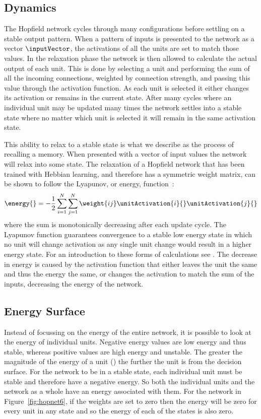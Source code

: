 \subsection{Dynamics}
\label{sec:Dynamics}
The Hopfield network cycles through many configurations before settling on a stable output pattern.  When a pattern of inputs is presented to the network as a vector $\inputVector$, the activations of all the units are set to match those values.  In the relaxation phase the network is then allowed to calculate the actual output of each unit.  This is done by selecting a unit and performing the sum of all the incoming connections, weighted by connection strength, and passing this value through the activation function.  As each unit is selected it either changes its activation or remains in the current state.  After many cycles where an individual unit may be updated many times the network settles into a stable state where no matter which unit is selected it will remain in the same activation state.

This ability to relax to a stable state is what we describe as the process of recalling a memory. When presented with a vector of input values the network will relax into some state.  The relaxation of a Hopfield network that has been trained with Hebbian learning, and therefore has a symmetric weight matrix, can be shown to follow the Lyapunov, or energy, function~\citep{Hopfield82,Kuhn1991}: 
\begin{equation}
	\label{eq:energyNetwork}
	\displaystyle\energy{}= -\frac{1}{2}\sum^{N}_{i=1}\sum^{N}_{j=1}\weight{ij}\unitActivation{i}{}\unitActivation{j}{}
\end{equation}
where the sum \energy{} is monotonically decreasing after each update cycle.  The Lyapunov function guarantees convergence to a stable low energy state in which no unit will change activation as any single unit change would result in a higher energy state.  For an introduction to these forms of calculations see \citet{Hertz1991}. The decrease in energy is caused by the activation function that either leaves the unit the same and thus the energy the same, or changes the activation to match the sum of the inputs, decreasing the energy of the network.

\subsection{Energy Surface}
\label{sec:energy}

Instead of focussing on the energy of the entire network, it is possible to look at the energy of individual units. Negative energy values are low energy and thus stable, whereas positive values are high energy and unstable.  The greater the magnitude of the energy of a unit (\unitEnergy{}{}) the further the unit is from the decision surface.  For the network to be in a stable state, each individual unit must be stable and therefore have a negative energy.  So both the individual units and the network as a whole have an energy associated with them.  For the network in Figure~\ref{fig:hopnet6}, if the weights are set to zero then the energy will be zero for every unit in any state and so the energy of each of the states is also zero.  

